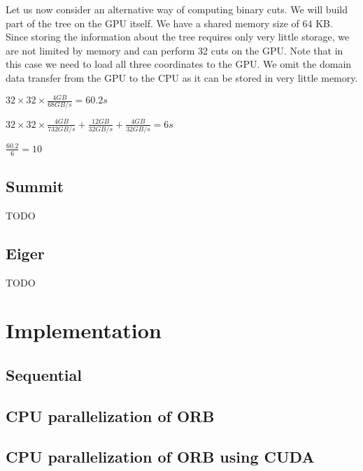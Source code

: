\documentclass[]{article}
\begin{document}
Let us now consider an alternative way of computing binary cuts. We will build part of the tree on the GPU itself. We have a shared memory size of 64 KB. Since storing the information about the tree requires only very little storage, we are not limited by memory and can perform 32 cuts on the GPU. Note that in this case we need to load all three coordinates to the GPU. We omit the domain data transfer from the GPU to the CPU as it can be stored in very little memory. 

\begin{center}
	$32 \times 32 \times \frac{ 4 GB}{68 GB/s} = 60.2 s$ 
\end{center}

\begin{center}
	$32 \times 32 \times \frac{4 GB}{732 GB/s} + \frac{12 GB}{32 GB/s} + \frac{4 GB}{32 GB/s} = 6 s$ 
\end{center}

\begin{center}
	$\frac{60.2}{6} = 10$ 
\end{center}

\subsection{Summit}

TODO

\subsection{Eiger}

TODO 

\section{Implementation}

\subsection{Sequential}

\subsection{CPU parallelization of ORB}

\subsection{CPU parallelization of ORB using CUDA }


\end{document}
